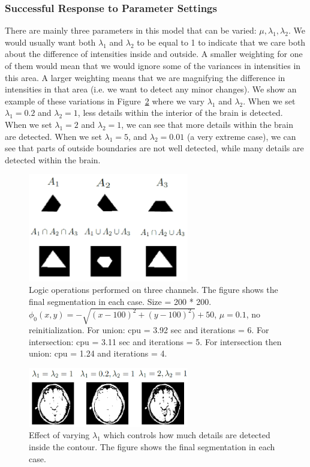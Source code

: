 \documentclass[10pt,twocolumn,letterpaper]{article}
\begin{document}
\subsubsection*{Successful Response to Parameter Settings}

There are mainly three parameters in this model that can be varied: $\mu, \lambda_{1}, \lambda_{2}$. We would usually want both $\lambda_{1}$ and $\lambda_{2}$
to be equal to 1 to indicate that we care both about the difference of intensities inside and outside. A smaller weighting for one of them would mean that we
would ignore some of the variances in intensities in this area. A larger weighting means that we are magnifying the difference in intensities in that area
(i.e. we want to detect any minor changes). We show an example of these variations in Figure~\ref{fig:cv_eg12} where we vary
$\lambda_1$ and $\lambda_2$. When we set $\lambda_1 = 0.2$ and $\lambda_2 = 1$, less details within the interior of the brain is detected. When
we set $\lambda_1 = 2$ and $\lambda_2 = 1$, we can see that more details within the brain are detected. When we set $\lambda_1 = 5$, and $\lambda_2 = 0.01$ (a
very extreme case), we can see that parts of outside boundaries are not well detected, while many details are detected within the brain.

\begin{figure}[t]
\centering
\includegraphics[width=7cm]{threech.png}
\caption{Logic operations performed on three channels. The figure shows the final segmentation in each case. Size = 200 * 200. $\phi_{0}(x,y) = - \sqrt{(x -
100)^2 + (y - 100)^2)} + 50$, $\mu = 0.1$, no reinitialization. For union: cpu = 3.92 sec and iterations = 6. For intersection: cpu = 3.11 sec and iterations =
5. For intersection then union: cpu = 1.24 and iterations = 4.}
\label{fig:threech}
\end{figure}

\begin{figure}[t]
\centering
\includegraphics[width=7cm]{cv_eg12.png}
\caption{Effect of varying $\lambda_1$ which controls how much details are detected inside the contour. The figure shows the final segmentation in each case.}
\label{fig:cv_eg12}
\end{figure}
\end{document}
